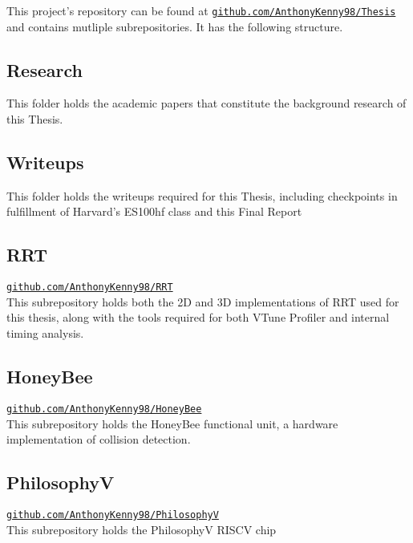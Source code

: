 
This project's repository can be found at \texttt{\href{github.com/AnthonyKenny98/Thesis}{github.com/AnthonyKenny98/Thesis}} and contains mutliple subrepositories. It has the following structure.

\subsection*{Research}
    This folder holds the academic papers that constitute the background research of this Thesis.

\subsection*{Writeups}
    This folder holds the writeups required for this Thesis, including checkpoints in fulfillment of Harvard's ES100hf class and this Final Report

\subsection*{RRT}
    \texttt{\href{github.com/AnthonyKenny98/RRT}{github.com/AnthonyKenny98/RRT}} \\
    This subrepository holds both the 2D and 3D implementations of RRT used for this thesis, along with the tools required for both VTune Profiler and internal timing analysis.

\subsection*{HoneyBee}
    \texttt{\href{github.com/AnthonyKenny98/HoneyBee}{github.com/AnthonyKenny98/HoneyBee}} \\
    This subrepository holds the HoneyBee functional unit, a hardware implementation of collision detection.

\subsection*{PhilosophyV}
    \texttt{\href{github.com/AnthonyKenny98/PhilosophyV}{github.com/AnthonyKenny98/PhilosophyV}} \\
    This subrepository holds the PhilosophyV RISCV chip
